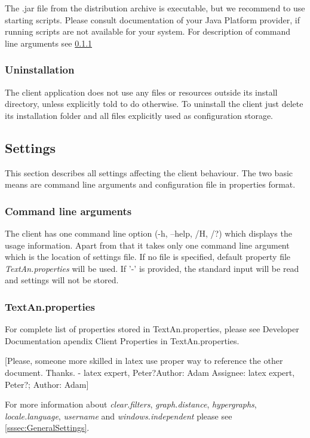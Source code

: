 \documentclass[12pt,a4paper]{report}
\makeatletter
\newcommand{\comment}[3][\@empty]{
  {\color{magenta}[#3 - }
  {\color{green}\ifx\@empty#1\relax Author: #2 \else Assignee: #1; Author: #2\fi}{\color{magenta}]}
}
\makeatother
\begin{document}
The .jar file from the distribution archive is executable,
but we recommend to use starting scripts.
Please consult documentation of your Java Platform provider,
if running scripts are not available for your system.
For description of command line arguments see \ref{ssec:CliCmdArg}

\subsubsection{Uninstallation}

The client application does not use any files or resources outside its install
directory, unless explicitly told to do otherwise.
To uninstall the client just delete its installation folder and all files
explicitly used as configuration storage.

\subsection{Settings}

This section describes all settings affecting the client behaviour.
The two basic means are command line arguments and configuration file in
properties format.

\subsubsection{Command line arguments}
\label{ssec:CliCmdArg}

The client has one command line option (-h, --help, /H, /?) which displays the
usage information. Apart from that it takes only one command line argument
which is the location of settings file. If no file is specified, default
property file \emph{TextAn.properties} will be used. If '-' is provided, the
standard input will be read and settings will not be stored.

\subsubsection{TextAn.properties}

For complete list of properties stored in TextAn.properties, please see
Developer Documentation apendix Client Properties in TextAn.properties.

\comment[latex expert, Peter?]{Adam}{Please, someone more skilled in latex use
proper way to reference the other document. Thanks.}

For more information about \emph{clear.filters}, \emph{graph.distance},
\emph{hypergraphs}, \emph{locale.language}, \emph{username}
and \emph{windows.independent} please see \ref{sssec:GeneralSettings}.
\end{document}

